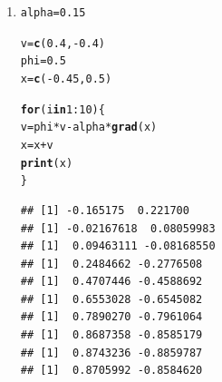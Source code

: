 \documentclass[a4paper]{article}
\makeatletter
\newcommand{\hlnum}[1]{\textcolor[rgb]{0.686,0.059,0.569}{#1}}%
\newcommand{\hlopt}[1]{\textcolor[rgb]{0,0,0}{#1}}%
\newcommand{\hlstd}[1]{\textcolor[rgb]{0.345,0.345,0.345}{#1}}%
\newcommand{\hlkwa}[1]{\textcolor[rgb]{0.161,0.373,0.58}{\textbf{#1}}}%
\newcommand{\hlkwb}[1]{\textcolor[rgb]{0.69,0.353,0.396}{#1}}%
\newcommand{\hlkwd}[1]{\textcolor[rgb]{0.737,0.353,0.396}{\textbf{#1}}}%
\newenvironment{kframe}{%
 \def\at@end@of@kframe{}%
 \ifinner\ifhmode%
  \def\at@end@of@kframe{\end{minipage}}%
  \begin{minipage}{\columnwidth}%
 \fi\fi%
 \def\FrameCommand##1{\hskip\@totalleftmargin \hskip-\fboxsep
 \colorbox{shadecolor}{##1}\hskip-\fboxsep
     \hskip-\linewidth \hskip-\@totalleftmargin \hskip\columnwidth}%
 \MakeFramed {\advance\hsize-\width
   \@totalleftmargin\z@ \linewidth\hsize
   \@setminipage}}%
 {\par\unskip\endMakeFramed%
 \at@end@of@kframe}
\newenvironment{knitrout}{}{} %
\makeatother
\begin{document}
{\begin{enumerate}
\item 

\begin{knitrout}
\color{fgcolor}\begin{kframe}
\begin{alltt}
\hlstd{alpha} \hlkwb{=} \hlnum{0.15}

\hlstd{v} \hlkwb{=} \hlkwd{c}\hlstd{(}\hlnum{0.4}\hlstd{,} \hlopt{-}\hlnum{0.4}\hlstd{)}
\hlstd{phi} \hlkwb{=} \hlnum{0.5}
\hlstd{x} \hlkwb{=} \hlkwd{c}\hlstd{(}\hlopt{-}\hlnum{0.45}\hlstd{,} \hlnum{0.5}\hlstd{)}

\hlkwa{for} \hlstd{(i} \hlkwa{in} \hlnum{1}\hlopt{:}\hlnum{10}\hlstd{)\{}
  \hlstd{v} \hlkwb{=} \hlstd{phi} \hlopt{*} \hlstd{v} \hlopt{-} \hlstd{alpha}\hlopt{*}\hlkwd{grad}\hlstd{(x)}
  \hlstd{x} \hlkwb{=} \hlstd{x} \hlopt{+} \hlstd{v}
  \hlkwd{print}\hlstd{(x)}
\hlstd{\}}
\end{alltt}
\begin{verbatim}
## [1] -0.165175  0.221700
## [1] -0.02167618  0.08059983
## [1]  0.09463111 -0.08168550
## [1]  0.2484662 -0.2776508
## [1]  0.4707446 -0.4588692
## [1]  0.6553028 -0.6545082
## [1]  0.7890270 -0.7961064
## [1]  0.8687358 -0.8585179
## [1]  0.8743236 -0.8859787
## [1]  0.8705992 -0.8584620
\end{verbatim}
\end{kframe}
\end{knitrout}


\end{enumerate}

}
\end{document}
